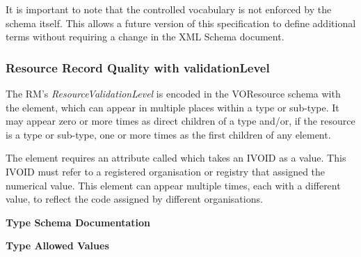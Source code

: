 \documentclass[11pt,a4paper]{ivoa}
\begin{document}
\endgroup


It is important to note that the 
controlled vocabulary is not enforced by the schema itself.  This
allows a future version of this specification to define additional
terms without requiring a change in the XML Schema document.


\subsubsection{Resource Record Quality with validationLevel}



The RM's \emph{ResourceValidationLevel} is encoded in the VOResource
schema with the  element, which can appear in
multiple places within a  type or sub-type.  It may
appear zero or more times as direct children of a 
type and/or, if the resource is a  type or sub-type,
one or more times as the first children of any 
element.  

The  element requires an attribute called
 which takes an IVOID as a value.  This IVOID
must refer to a registered organisation or registry that assigned the
numerical value.  This element can appear multiple times, each with
a different  value, to reflect the code
assigned by different organisations. 


\begingroup
      	\renewcommand*\descriptionlabel[1]{%
      	\hbox to 5.5em{\emph{#1}\hfil}}\vspace{2ex}\noindent\textbf{ Type Schema Documentation}



\vspace{2ex}\noindent\textbf{ Type Allowed Values}
\end{document}

